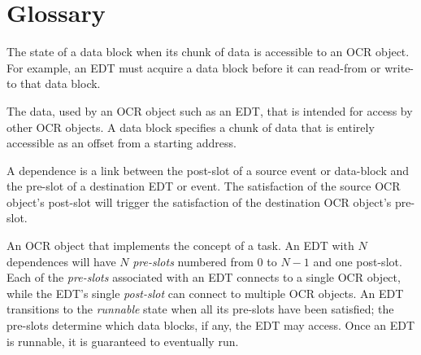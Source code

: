 %
%

%
\section{Glossary}
\label{sec:Glossary}
\glossarydefstart
The state of a data block when its chunk of data is accessible to an
OCR object. For example, an EDT must acquire a data block before it
can read-from or write-to that data block.
\glossarydefend

\glossarydefstart
The data, used by an OCR object such as an EDT, that is intended for
access by other OCR objects. A data block specifies
a chunk of data that is entirely accessible as an offset from a starting address.
\glossarydefend

\glossarydefstart
A dependence is a link between the post-slot of a source event or
data-block and the pre-slot of a destination EDT or event. The
satisfaction of the source OCR object's post-slot will trigger the
satisfaction of the destination OCR object's pre-slot.
\glossarydefend

\glossarydefstart
An OCR object that implements the concept of a task. An EDT with $N$
dependences will have $N$ \emph{pre-slots} numbered from $0$ to $N-1$
and one post-slot.
Each of the \emph{pre-slots} associated with an EDT connects to a
single OCR object, while the EDT’s single \emph{post-slot} can connect
to multiple OCR objects. An EDT transitions to the \emph{runnable} state when all its
pre-slots have been satisfied; the pre-slots determine which
data blocks, if any, the EDT may access.  Once an EDT is runnable, it is guaranteed to
eventually run.
\glossarydefend

